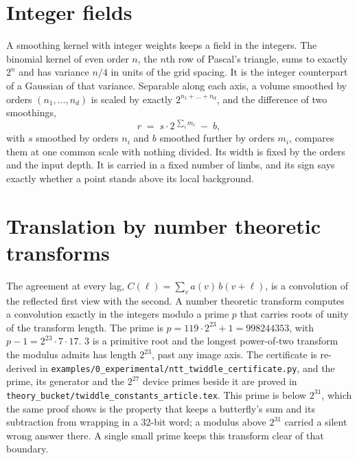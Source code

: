 \section{Integer fields}

A smoothing kernel with integer weights keeps a field in the integers. The binomial kernel of even
order \(n\), the \(n\)th row of Pascal's triangle, sums to exactly \(2^n\) and has variance \(n/4\) in units of
the grid spacing. It is the integer counterpart of a Gaussian of that variance. Separable along each
axis, a volume smoothed by orders \((n_1, \dots, n_d)\) is scaled by exactly \(2^{n_1 + \dots + n_d}\), and
the difference of two smoothings,
\[
r \;=\; s \cdot 2^{\,\sum_i m_i} \;-\; b,
\]
with \(s\) smoothed by orders \(n_i\) and \(b\) smoothed further by orders \(m_i\), compares them at one common
scale with nothing divided. Its width is fixed by the orders and the input depth. It is carried in a
fixed number of limbs, and its sign says exactly whether a point stands above its local background.

\section{Translation by number theoretic transforms}

The agreement at every lag, \(C(\ell) = \sum_v a(v)\, b(v + \ell)\), is a convolution of the reflected
first view with the second. A number theoretic transform computes a convolution exactly in the
integers modulo a prime \(p\) that carries roots of unity of the transform length. The prime is
\(p = 119 \cdot 2^{23} + 1 = 998244353\), with \(p - 1 = 2^{23} \cdot 7 \cdot 17\). 3 is a primitive
root and the longest power-of-two transform the modulus admits has length \(2^{23}\), past any image
axis. The certificate is re-derived in
\texttt{examples/\allowbreak{}0\_experimental/\allowbreak{}ntt\_twiddle\_certificate.py}, and the prime,
its generator and the \(2^{27}\) device primes beside it are proved in
\texttt{theory\_bucket/\allowbreak{}twiddle\_constants\_article.tex}. This prime is below \(2^{31}\),
which the same proof shows is the property that keeps a butterfly's sum and its subtraction from
wrapping in a 32-bit word; a modulus above \(2^{31}\) carried a silent wrong answer there. A single
small prime keeps this transform clear of that boundary.

